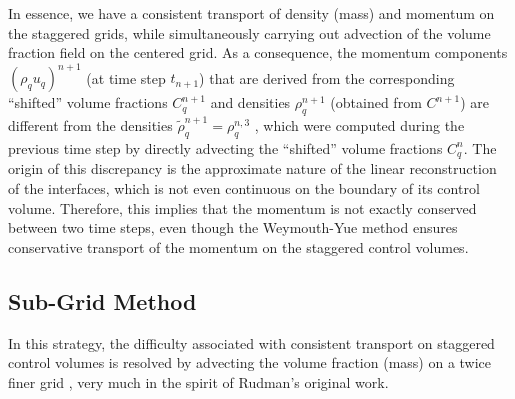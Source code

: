 In essence, we have a consistent transport of density (mass)
and momentum on the staggered grids, while simultaneously 
carrying out advection of the volume fraction field on the centered grid. 
As a consequence, the momentum components $(\rho_q u_q)^{n+1}$ 
(at time step $t_{n+1}$) that are derived from the 
corresponding ``shifted'' volume fractions $C^{n+1}_q$ 
and densities $\rho^{n+1}_q$  (obtained from $C^{n+1}$)
are different from the densities $\tilde \rho_q^{n+1} = \rho_q^{n,3}$
, which were computed during the previous time step 
by directly advecting the ``shifted'' volume fractions $C^{n}_q$. 
The origin of this discrepancy is the approximate nature of the  
linear reconstruction of the interfaces, which is not 
even continuous on the boundary of its control volume.
Therefore, this implies that the momentum is not exactly
conserved between two time steps, even though the Weymouth-Yue method
ensures conservative transport of the momentum on the staggered control volumes. 




\subsection*{Sub-Grid Method}

In this strategy, the difficulty associated with consistent 
transport on staggered control volumes is resolved by advecting  
the volume fraction (mass) on a twice finer grid 
, very much in the spirit of Rudman's \cite{rudman1998volume} original work. 

